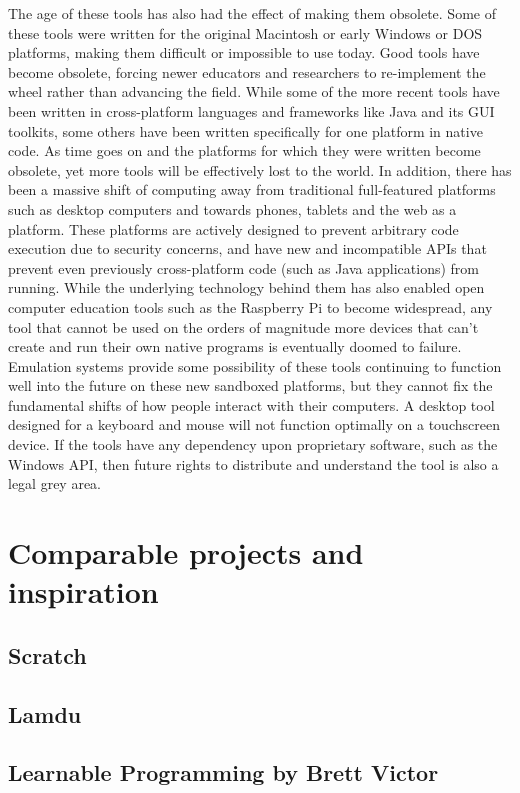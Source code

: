 The age of these tools has also had the effect of making them obsolete. Some of these tools were written for the original Macintosh or early Windows or DOS platforms, making them difficult or impossible to use today. Good tools have become obsolete, forcing newer educators and researchers to re-implement the wheel rather than advancing the field. While some of the more recent tools have been written in cross-platform languages and frameworks like Java and its GUI toolkits, some others have been written specifically for one platform in native code. As time goes on and the platforms for which they were written become obsolete, yet more tools will be effectively lost to the world. In addition, there has been a massive shift of computing away from traditional full-featured platforms such as desktop computers and towards phones, tablets and the web as a platform. These platforms are actively designed to prevent arbitrary code execution due to security concerns, and have new and incompatible APIs that prevent even previously cross-platform code (such as Java applications) from running. While the underlying technology behind them has also enabled open computer education tools such as the Raspberry Pi to become widespread, any tool that cannot be used on the orders of magnitude more devices that can't create and run their own native programs is eventually doomed to failure. Emulation systems provide some possibility of these tools continuing to function well into the future on these new sandboxed platforms, but they cannot fix the fundamental shifts of how people interact with their computers. A desktop tool designed for a keyboard and mouse will not function optimally on a touchscreen device. If the tools have any dependency upon proprietary software, such as the Windows API, then future rights to distribute and understand the tool is also a legal grey area.


\section{Comparable projects and inspiration}

\subsection{Scratch}

\subsection{Lamdu}

\subsection{Learnable Programming by Brett Victor}
